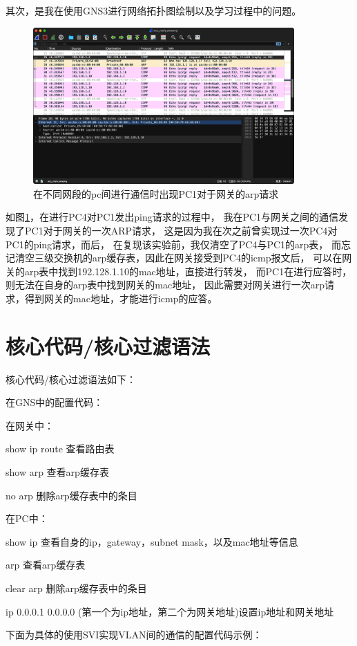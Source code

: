 \documentclass[a4paper,12pt]{report}
\begin{document}
\begin{spacing}{1.5}
其次，是我在使用GNS3进行网络拓扑图绘制以及学习过程中的问题。
\begin{figure}[htb!]
  \centering
\includegraphics[width=10cm]{figure/question.png}
\caption{在不同网段的pc间进行通信时出现PC1对于网关的arp请求}
\label{question}
\end{figure}
如图\ref{question}，在进行PC4对PC1发出ping请求的过程中，
我在PC1与网关之间的通信发现了PC1对于网关的一次ARP请求，
这是因为我在次之前曾实现过一次PC4对PC1的ping请求，而后，
在复现该实验前，我仅清空了PC4与PC1的arp表，
而忘记清空三级交换机的arp缓存表，因此在网关接受到PC4的icmp报文后，
可以在网关的arp表中找到192.128.1.10的mac地址，直接进行转发，
而PC1在进行应答时，则无法在自身的arp表中找到网关的mac地址，
因此需要对网关进行一次arp请求，得到网关的mac地址，才能进行icmp的应答。




\section{核心代码/核心过滤语法}
\songti

核心代码/核心过滤语法如下：

在GNS中的配置代码：

在网关中：

show ip route 查看路由表

show arp 查看arp缓存表

no arp 删除arp缓存表中的条目



在PC中：

show ip 查看自身的ip，gateway，subnet mask，以及mac地址等信息

arp 查看arp缓存表

clear arp 删除arp缓存表中的条目

ip 0.0.0.1 0.0.0.0 (第一个为ip地址，第二个为网关地址)设置ip地址和网关地址


下面为具体的使用SVI实现VLAN间的通信的配置代码示例：


\end{spacing}
\end{document}

